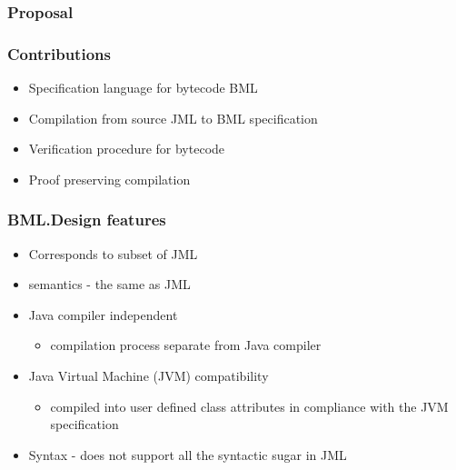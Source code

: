 \documentclass{beamer}
\begin{document}
\begin{frame}\frametitle{Proposal}
\begin{center}
\end{center}
\end{frame}


\begin{frame}\frametitle{Contributions}   
  \begin{itemize}
     \item Specification language for bytecode BML
     \item Compilation from source JML to BML specification
     \item Verification procedure for bytecode 
     \item Proof preserving compilation
\end{itemize}
\end{frame} 









  \begin{frame}[shrink]\frametitle{BML.Design features}
   \begin{itemize}
      \item Corresponds to subset of JML
       \item  semantics - the same  as JML
     \item Java compiler independent
        \begin{itemize}
	    \item compilation process separate from Java compiler
	      
	  \end{itemize}
     \item Java Virtual Machine (JVM) compatibility 
       \begin{itemize}
	      \item compiled into user defined class attributes 
		 in compliance with the JVM specification
	  \end{itemize}     
      \item Syntax - does not support all the syntactic sugar in JML
   \end{itemize} 
\end{frame}
\end{document}
